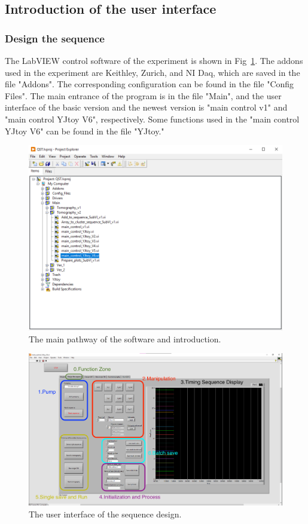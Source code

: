 \documentclass{article}
\begin{document}
\subsection{Introduction of the user interface}
\subsubsection{Design the sequence\label{subsubsec:Qst}}
The LabVIEW control software of the experiment is shown in Fig~\ref{fig:pathway}. The addons used in the experiment are Keithley, Zurich, and NI Daq, which are saved in the file "Addons". The corresponding configuration can be found in the file "Config Files". The main entrance of the program is in the file "Main", and the user interface of the basic version and the newest version is "main control v1" and "main control YJtoy V6", respectively. Some functions used in the "main control YJtoy V6" can be found in the file "YJtoy."
\begin{figure}[htbp]
    \centering
    \includegraphics[width=0.8\linewidth]{fig/Project.png}
    \caption{The main pathway of the software and introduction.}
    \label{fig:pathway}
\end{figure}
\begin{figure}[htbp]
    \centering
    \includegraphics[width=0.9\linewidth]{fig/State preparation.png}
    \caption{The user interface of the sequence design.}
    \label{fig:UI}
\end{figure}
\end{document}
